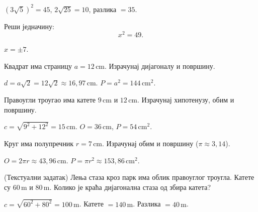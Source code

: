 \documentclass[11pt,a5paper,twoside,addpoints,noanswers]{exam} %
\begin{document}
\begin{questions}
\begin{solution}[\stretch 1]
$(3\sqrt{5})^2=45$, \quad $2\sqrt{25}=10$,  
разлика $=35$.
\end{solution}

\question[8]
Реши једначину:
\[
x^2 = 49.
\]

\begin{solution}[\stretch 1]
$x=\pm 7$.
\end{solution}

\ifprintanswers\else\newpage\fi

\question[8]
Квадрат има страницу $a=12\,\text{cm}$. Израчунај дијагоналу и површину.

\begin{solution}[\stretch 2]
$d=a\sqrt{2}=12\sqrt{2}\approx 16{,}97\,\text{cm}$.  
$P=a^2=144\,\text{cm}^2$.
\end{solution}

\question[10]
Правоугли троугао има катете $9\,\text{cm}$ и $12\,\text{cm}$. Израчунај хипотенузу, обим и површину.

\begin{solution}[\stretch 2]
$c=\sqrt{9^2+12^2}=15\,\text{cm}$.  
$O=36\,\text{cm}$, \quad $P=54\,\text{cm}^2$.
\end{solution}

\ifprintanswers\else\newpage\fi

\question[10]
Круг има полупречник $r=7\,\text{cm}$. Израчунај обим и површину ($\pi\approx 3{,}14$).

\begin{solution}[\stretch 2]
$O=2\pi r \approx 43{,}96\,\text{cm}$.  
$P=\pi r^2 \approx 153{,}86\,\text{cm}^2$.
\end{solution}

\question[10]
(Текстуални задатак) Лења стаза кроз парк има облик правоуглог троугла. Катете су $60\,\text{m}$ и $80\,\text{m}$. Колико је краћа дијагонална стаза од збира катета?

\begin{solution}[\stretch 2]
$c=\sqrt{60^2+80^2}=100\,\text{m}$.  
Катете $=140\,\text{m}$.  
Разлика $=40\,\text{m}$.
\end{solution}

\end{questions}
\end{document}
